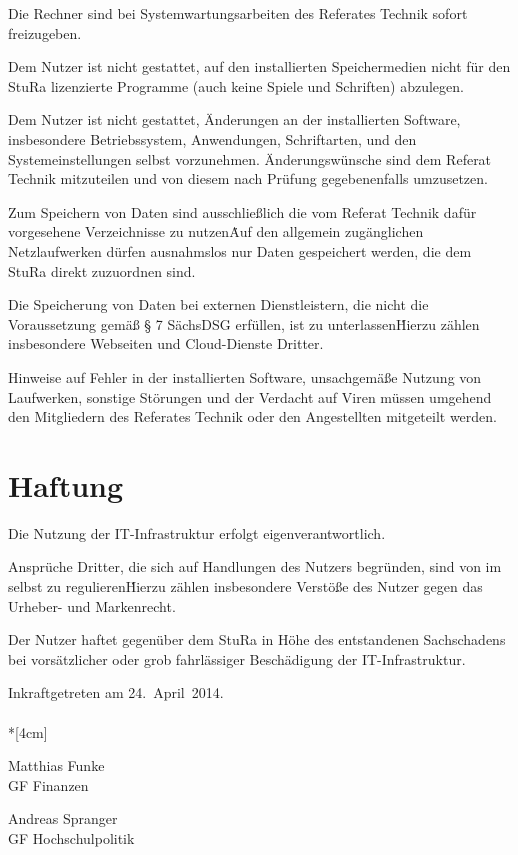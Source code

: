 \begin{multicols}{2}
\Abs \Satz Die Rechner sind bei Systemwartungsarbeiten des Referates Technik sofort freizugeben. 

\Abs \Satz Dem Nutzer ist nicht gestattet, auf den installierten Speichermedien nicht für den StuRa lizenzierte Programme (auch keine Spiele und Schriften) abzulegen. 

\Abs \Satz Dem Nutzer ist nicht gestattet, Änderungen an der installierten Software, insbesondere Betriebssystem, Anwendungen, Schriftarten, und den Systemeinstellungen selbst vorzunehmen. Änderungswünsche sind dem Referat Technik mitzuteilen und von diesem nach Prüfung gegebenenfalls umzusetzen. 

\Abs \Satz Zum Speichern von Daten sind ausschließlich die vom Referat Technik dafür vorgesehene Verzeichnisse zu nutzen\. Auf den allgemein zugänglichen Netzlaufwerken dürfen ausnahmslos nur Daten gespeichert werden, die dem StuRa direkt zuzuordnen sind. 

\Abs \Satz Die Speicherung von Daten bei externen Dienstleistern, die nicht die Voraussetzung gemäß § 7 SächsDSG erfüllen, ist zu unterlassen\. Hierzu zählen insbesondere Webseiten und Cloud-Dienste Dritter. 

\Abs \Satz Hinweise auf Fehler in der installierten Software, unsachgemäße Nutzung von Laufwerken, sonstige Störungen und der Verdacht auf Viren müssen umgehend den Mitgliedern des Referates Technik oder den Angestellten mitgeteilt werden. 


\section{Haftung}

\Abs \Satz Die Nutzung der IT-Infrastruktur erfolgt eigenverantwortlich. 

\Abs \Satz Ansprüche Dritter, die sich auf Handlungen des Nutzers begründen, sind von im selbst zu regulieren\. Hierzu zählen insbesondere Verstöße des Nutzer gegen das Urheber- und Markenrecht. 

\Abs \Satz Der Nutzer haftet gegenüber dem StuRa in Höhe des entstandenen Sachschadens bei vorsätzlicher oder grob fahrlässiger Beschädigung der IT-Infrastruktur. 



\end{multicols}

\nopagebreak
\vspace{1cm}
Inkraftgetreten am 24.~April~2014.
\\



\normalsize
~\\*[4cm]
\begin{center}
\hspace*{\fill}
\parbox{7cm}{Matthias Funke\\GF Finanzen}
\hfill\parbox{7cm}{Andreas Spranger\\GF Hochschulpolitik}
\hspace*{\fill}
\end{center}